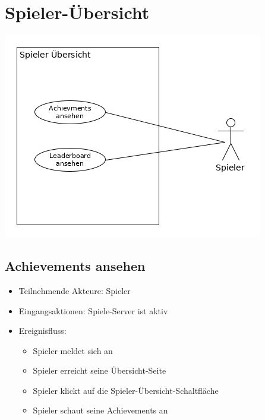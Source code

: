 \documentclass[a4paper]{scrreprt}
\begin{document}
    \section{Spieler-Übersicht}
    \includegraphics[width=\textwidth]{uml/export/Spieler_Ubersicht.png}
	    \subsection{Achievements ansehen}
    \begin{itemize}
        \item Teilnehmende Akteure: \Gls{Spieler}
        \item Eingangsaktionen: Spiele-Server ist aktiv
        \item Ereignisfluss:
        \begin{itemize}
            \item Spieler meldet sich an
            \item Spieler erreicht seine Übersicht-Seite
            \item Spieler klickt auf die Spieler-Übersicht-Schaltfläche
            \item Spieler schaut seine Achievements an
        \end{itemize}
    \end{itemize}
\end{document}
